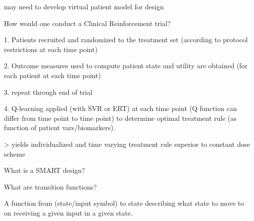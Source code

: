 \documentclass[10pt]{article}
\begin{document}
may need to develop virtual patient model for design 


\hrulefill

How would one conduct a Clinical Reinforcement trial?

1. Patients recruited and randomized to the treatment set (according to protocol restrictions at each time point)

2. Outcome measures used to compute patient state and utility are obtained (for each patient at each time point)

3. repeat through end of trial

4. Q-learning applied (with SVR or ERT) at each time point (Q function can differ from time point to time point) to determine optimal treatment rule (as function of patient vars/biomarkers).

> yields individualized and time varying treatment rule superior to constant dose scheme


\hrulefill

What is a SMART design?
	
\hrulefill

What are transition functions?

A function from (state/input symbol) to state describing what state to move to on receiving a given input in a given state.
\end{document}
